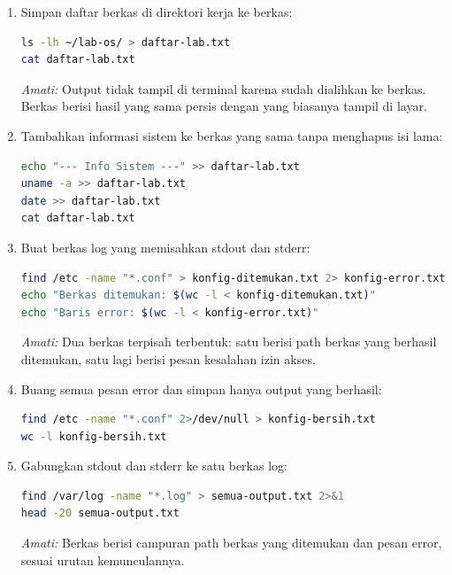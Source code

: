 \begin{enumerate}
    \item Simpan daftar berkas di direktori kerja ke berkas:
\begin{lstlisting}[language=bash, caption={Simpan output ke berkas baru}]
ls -lh ~/lab-os/ > daftar-lab.txt
cat daftar-lab.txt
\end{lstlisting}
    \textit{Amati:} Output tidak tampil di terminal karena sudah dialihkan ke berkas. Berkas  berisi hasil yang sama persis dengan yang biasanya tampil di layar.

    \item Tambahkan informasi sistem ke berkas yang sama tanpa menghapus isi lama:
\begin{lstlisting}[language=bash, caption={Tambahkan output ke berkas yang sudah ada}]
echo "--- Info Sistem ---" >> daftar-lab.txt
uname -a >> daftar-lab.txt
date >> daftar-lab.txt
cat daftar-lab.txt
\end{lstlisting}

    \item Buat berkas log yang memisahkan stdout dan stderr:
\begin{lstlisting}[language=bash, caption={Pisahkan stdout dan stderr ke berkas berbeda}]
find /etc -name "*.conf" > konfig-ditemukan.txt 2> konfig-error.txt
echo "Berkas ditemukan: $(wc -l < konfig-ditemukan.txt)"
echo "Baris error: $(wc -l < konfig-error.txt)"
\end{lstlisting}
    \textit{Amati:} Dua berkas terpisah terbentuk: satu berisi path berkas yang berhasil ditemukan, satu lagi berisi pesan kesalahan izin akses.

    \item Buang semua pesan error dan simpan hanya output yang berhasil:
\begin{lstlisting}[language=bash, caption={Buang stderr ke /dev/null}]
find /etc -name "*.conf" 2>/dev/null > konfig-bersih.txt
wc -l konfig-bersih.txt
\end{lstlisting}

    \item Gabungkan stdout dan stderr ke satu berkas log:
\begin{lstlisting}[language=bash, caption={Gabungkan stdout dan stderr ke satu berkas}]
find /var/log -name "*.log" > semua-output.txt 2>&1
head -20 semua-output.txt
\end{lstlisting}
    \textit{Amati:} Berkas  berisi campuran path berkas yang ditemukan dan pesan error, sesuai urutan kemunculannya.
\end{enumerate}

